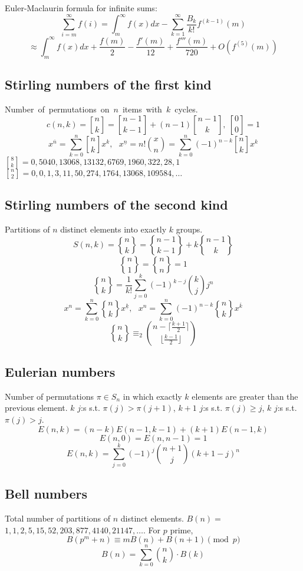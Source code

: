 		Euler-Maclaurin formula for infinite sums:
		\small
		\[ \sum_{i=m}^{\infty} f(i) = \int_m^\infty f(x) dx - \sum_{k=1}^\infty \frac{B_k}{k!}f^{(k-1)}(m) \]
		\[ \approx \int_{m}^\infty f(x)dx + \frac{f(m)}{2} - \frac{f'(m)}{12} + \frac{f'''(m)}{720} + O(f^{(5)}(m)) \]
		\normalsize

	\subsection{Stirling numbers of the first kind}
		\mbox{Number of permutations on $n$ items with $k$ cycles.}
		$$c(n,k) = {n\brack k}={n-1 \brack k-1} + (n-1) {n-1 \brack k},\ {0 \brack 0} = 1 $$
		$$x^{\overline{n}} = \sum_{k=0}^n {n\brack k}x^k, \ \ \ x^{\underline{n}} = n!{x \choose n} = \sum_{k=0}^n (-1)^{n-k} {n\brack k} x^k $$
		\mbox{${8 \brack k} = 0, 5040, 13068, 13132, 6769, 1960, 322, 28, 1$}
		\mbox{${n \brack 2} = 0, 0, 1, 3, 11, 50, 274, 1764, 13068, 109584, \dots$}

	\subsection{Stirling numbers of the second kind}
		Partitions of $n$ distinct elements into exactly $k$ groups.
		$$S(n,k) = {n \brace k} = {n-1 \brace k-1} + k {n-1 \brace k}$$
		$${n \brace 1} = {n \brace n} = 1$$
		$${n \brace k} = \frac{1}{k!}\sum_{j=0}^k (-1)^{k-j}\binom{k}{j}j^n$$
		$$x^n = \sum_{k=0}^n {n\brace k}x^{\underline{k}}, \ \ \ x^n = \sum_{k=0}^n (-1)^{n-k} {n\brace k} x^{\overline{k}} $$
		$${n \brace k} \equiv_2 \binom{n-\lceil\frac{k+1}{2}\rceil}{\lfloor\frac{k-1}{2}\rfloor}$$

	\subsection{Eulerian numbers}
		Number of permutations $\pi \in S_n$ in which exactly $k$ elements are greater than the previous element. $k$ $j$:s s.t. $\pi(j)>\pi(j+1)$, $k+1$ $j$:s s.t. $\pi(j)\geq j$, $k$ $j$:s s.t. $\pi(j)>j$.
		$$E(n,k) = (n-k)E(n-1,k-1) + (k+1)E(n-1,k)$$
		$$E(n,0) = E(n,n-1) = 1$$
		$$E(n,k) = \sum_{j=0}^k(-1)^j\binom{n+1}{j}(k+1-j)^n$$

	\subsection{Bell numbers}
		Total number of partitions of $n$ distinct elements. $B(n) =$
		$1, 1, 2, 5, 15, 52, 203, 877, 4140, 21147, \dots$. For $p$ prime,
		\[ B(p^m+n)\equiv mB(n)+B(n+1) \pmod{p} \]
		$$B(n) = \sum_{k=0}^n \binom{n}{k}\cdot B(k)$$

